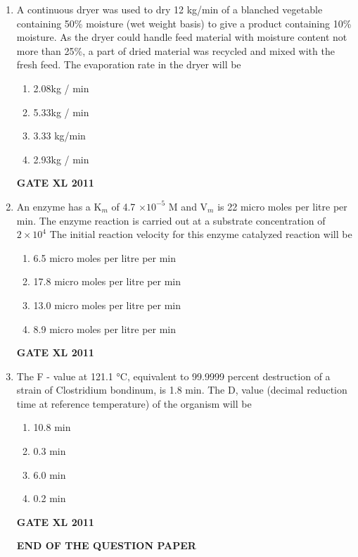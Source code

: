 \documentclass[journal,12pt,onecolumn]{IEEEtran}
\begin{document}
\begin{enumerate}
{Identify the CORRECT sequence.}
\begin{enumerate}
	\item QSRP
	\item PQRS
	\item QPSR
	\item RSPQ
\end{enumerate}
\hfill{\textbf{GATE XL 2011}}
\item{ A continuous dryer was used to dry 12 kg/min of a blanched vegetable containing 50\% moisture (wet weight basis) to give a product containing 10\% moisture. As the dryer could handle feed material with moisture content not more than 25\%, a part of dried material was recycled and mixed with the fresh feed. The evaporation rate in the dryer will be}
\begin{enumerate}
	\item 2.08kg / min
	\item 5.33kg / min
	\item 3.33 kg/min
	\item 2.93kg / min
\end{enumerate}
\hfill{\textbf{GATE XL 2011}}
\item {An enzyme has a K$_m$ of 4.7 $\times 10 ^{- 5}$ M and V$_m$ is 22 micro moles per litre per min. The enzyme reaction is carried out at a substrate concentration of $2 \times 10^ 4$ The initial reaction velocity for this enzyme catalyzed reaction will be}
\begin{enumerate}
	\item 6.5 micro moles per litre per min
	\item 17.8 micro moles per litre per min
	\item 13.0 micro moles per litre per min
	\item 8.9 micro moles per litre per min
\end{enumerate}
\hfill{\textbf{GATE XL 2011}}
\item {The F - value at 121.1 °C, equivalent to 99.9999 percent destruction of a strain of Clostridium bondinum, is 1.8 min. The D, value (decimal reduction time at reference temperature) of the organism will be}
\begin{enumerate}
	\item 10.8 min
	\item 0.3 min
	\item 6.0 min
	\item 0.2 min
\end{enumerate}
\hfill{\textbf{GATE XL 2011}}
\begin{center}
\textbf{END OF THE QUESTION PAPER}
\end{center}


\end{enumerate}
\end{document}
